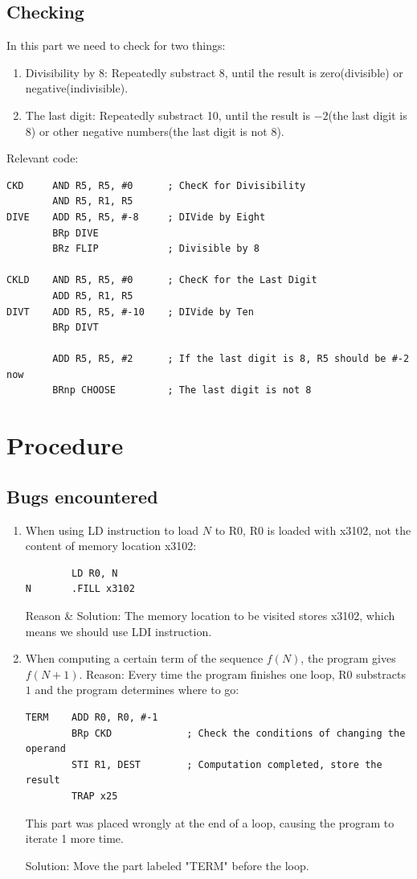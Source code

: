 \documentclass[UTF8]{ctexart}
\begin{document}
\subsection{Checking}
In this part we need to check for two things:
\begin{enumerate}
  \item Divisibility by 8: Repeatedly substract 8, until the result is zero(divisible) or negative(indivisible).
  \item The last digit: Repeatedly substract 10, until the result is $-2$(the last digit is 8) or other negative numbers(the last digit is not 8).
\end{enumerate}

Relevant code:
\begin{lstlisting}
CKD     AND R5, R5, #0      ; ChecK for Divisibility
        AND R5, R1, R5      
DIVE    ADD R5, R5, #-8     ; DIVide by Eight
        BRp DIVE
        BRz FLIP            ; Divisible by 8
  
CKLD    AND R5, R5, #0      ; ChecK for the Last Digit
        ADD R5, R1, R5
DIVT    ADD R5, R5, #-10    ; DIVide by Ten
        BRp DIVT
  
        ADD R5, R5, #2      ; If the last digit is 8, R5 should be #-2 now 
        BRnp CHOOSE         ; The last digit is not 8
\end{lstlisting}

\section{Procedure}
\subsection{Bugs encountered}
\begin{enumerate}
        \item When using LD instruction to load $N$ to R0, R0 is loaded with x3102, not the content of memory location x3102:
\begin{lstlisting}
        LD R0, N
N       .FILL x3102
\end{lstlisting}
        Reason \& Solution: The memory location to be visited stores x3102, which means we should use LDI instruction.
        \item When computing a certain term of the sequence $f(N)$, the program gives $f(N+1)$.
        Reason: Every time the program finishes one loop, R0 substracts $1$ and the program determines where to go:
\begin{lstlisting}
TERM    ADD R0, R0, #-1
        BRp CKD             ; Check the conditions of changing the operand
        STI R1, DEST        ; Computation completed, store the result
        TRAP x25
\end{lstlisting}
This part was placed wrongly at the end of a loop, causing the program to iterate 1 more time.

Solution: Move the part labeled "TERM" before the loop.
\end{enumerate}
\end{document}
